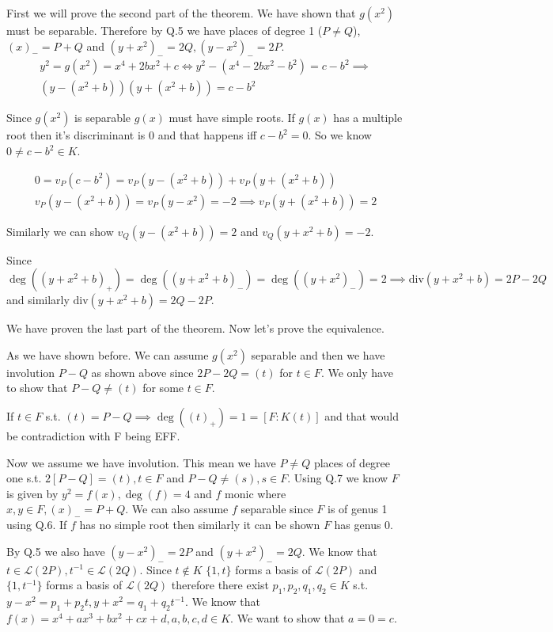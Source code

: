 \documentclass[12pt, a4paper]{article}
\begin{document}
First we will prove the second part of the theorem. We have shown that $g(x^2)$ must be separable. Therefore by Q.5 we have places of degree 1 ($P\neq Q$), $(x)_{-} = P+Q$ and $(y+x^2)_{-}=2Q, (y-x^2)_{-} = 2P$.
\begin{gather*}
y^2=g(x^2) = x^4+2bx^2+c \iff y^2-(x^4-2bx^2-b^2) = c - b^2 \implies \\
(y-(x^2+b))(y+(x^2+b))=c-b^2
\end{gather*}

Since $g(x^2)$ is separable $g(x)$ must have simple roots. If $g(x)$ has a multiple root then it's discriminant is 0 and that happens iff $c-b^2=0$. So we know $0 \neq c-b^2 \in K$.

\begin{gather*}
0=v_P(c-b^2)=v_P(y-(x^2+b)) + v_P(y+(x^2+b))\\
v_P(y-(x^2+b)) = v_P(y-x^2) = -2 \implies v_P(y+(x^2+b)) = 2
\end{gather*}

Similarly we can show $v_Q(y-(x^2+b)) = 2$ and $v_Q(y+x^2+b)=-2$. 

Since $\deg((y+x^2+b)_{+}) = \deg((y+x^2+b)_{-}) = \deg((y+x^2)_{-}) = 2 \implies \text{div}(y+x^2+b) = 2P - 2Q$ and similarly $\text{div}(y+x^2+b) = 2Q - 2P$.

We have proven the last part of the theorem. Now let's prove the equivalence.

As we have shown before. We can assume $g(x^2)$ separable and then we have involution $P-Q$ as shown above since $2P-2Q = (t)$ for $t \in F$. We only have to show that $P-Q \neq (t)$ for some $t \in F$. 

If $t \in F$ s.t. $(t) = P - Q \implies \deg((t)_{+}) = 1 = [F:K(t)]$ and that would be contradiction with F being EFF.

Now we assume we have involution. This mean we have $P \neq Q$ places of degree one s.t. $2[P-Q]=(t), t \in F$ and $P-Q \neq (s), s \in F$. Using Q.7 we know $F$ is given by $y^2 = f(x), \deg(f)=4$ and $f$ monic where $x,y \in F, (x)_{-} = P+Q$. We can also assume $f$ separable since $F$ is of genus 1 using Q.6. If $f$ has no simple root then similarly it can be shown $F$ has genus 0.

By Q.5 we also have $(y-x^2)_{-} = 2P$ and $(y+x^2)_{-} = 2Q$. We know that $t \in \mathcal{L}(2P), t^{-1} \in \mathcal{L}(2Q)$. Since $t \notin K$ $\{1,t\}$ forms a basis of $\mathcal{L}(2P)$ and $\{1,t^{-1}\}$ forms a basis of $\mathcal{L}(2Q)$ therefore there exist $p_1, p_2, q_1, q_2 \in K$ s.t. $y-x^2 = p_1+p_2t, y+x^2=q_1+q_2t^{-1}$. We know that $f(x)=x^4+ax^3+bx^2+cx+d, a,b,c,d \in K$. We want to show that $a = 0 = c$. 
\end{document}
